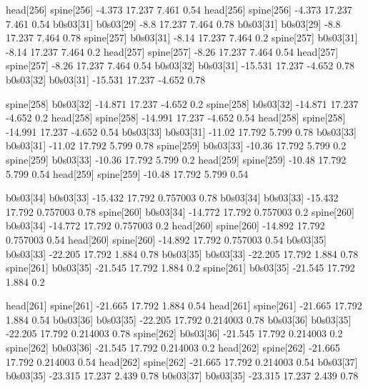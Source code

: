 head[256]    spine[256]    -4.373    17.237    7.461    0.54
head[256]    spine[256]    -4.373    17.237    7.461    0.54
b0s03[31]    b0s03[29]    -8.8    17.237    7.464    0.78
b0s03[31]    b0s03[29]    -8.8    17.237    7.464    0.78
spine[257]    b0s03[31]    -8.14    17.237    7.464    0.2
spine[257]    b0s03[31]    -8.14    17.237    7.464    0.2
head[257]    spine[257]    -8.26    17.237    7.464    0.54
head[257]    spine[257]    -8.26    17.237    7.464    0.54
b0s03[32]    b0s03[31]    -15.531    17.237    -4.652    0.78
b0s03[32]    b0s03[31]    -15.531    17.237    -4.652    0.78


spine[258]    b0s03[32]    -14.871    17.237    -4.652    0.2
spine[258]    b0s03[32]    -14.871    17.237    -4.652    0.2
head[258]    spine[258]    -14.991    17.237    -4.652    0.54
head[258]    spine[258]    -14.991    17.237    -4.652    0.54
b0s03[33]    b0s03[31]    -11.02    17.792    5.799    0.78
b0s03[33]    b0s03[31]    -11.02    17.792    5.799    0.78
spine[259]    b0s03[33]    -10.36    17.792    5.799    0.2
spine[259]    b0s03[33]    -10.36    17.792    5.799    0.2
head[259]    spine[259]    -10.48    17.792    5.799    0.54
head[259]    spine[259]    -10.48    17.792    5.799    0.54


b0s03[34]    b0s03[33]    -15.432    17.792    0.757003    0.78
b0s03[34]    b0s03[33]    -15.432    17.792    0.757003    0.78
spine[260]    b0s03[34]    -14.772    17.792    0.757003    0.2
spine[260]    b0s03[34]    -14.772    17.792    0.757003    0.2
head[260]    spine[260]    -14.892    17.792    0.757003    0.54
head[260]    spine[260]    -14.892    17.792    0.757003    0.54
b0s03[35]    b0s03[33]    -22.205    17.792    1.884    0.78
b0s03[35]    b0s03[33]    -22.205    17.792    1.884    0.78
spine[261]    b0s03[35]    -21.545    17.792    1.884    0.2
spine[261]    b0s03[35]    -21.545    17.792    1.884    0.2


head[261]    spine[261]    -21.665    17.792    1.884    0.54
head[261]    spine[261]    -21.665    17.792    1.884    0.54
b0s03[36]    b0s03[35]    -22.205    17.792    0.214003    0.78
b0s03[36]    b0s03[35]    -22.205    17.792    0.214003    0.78
spine[262]    b0s03[36]    -21.545    17.792    0.214003    0.2
spine[262]    b0s03[36]    -21.545    17.792    0.214003    0.2
head[262]    spine[262]    -21.665    17.792    0.214003    0.54
head[262]    spine[262]    -21.665    17.792    0.214003    0.54
b0s03[37]    b0s03[35]    -23.315    17.237    2.439    0.78
b0s03[37]    b0s03[35]    -23.315    17.237    2.439    0.78


